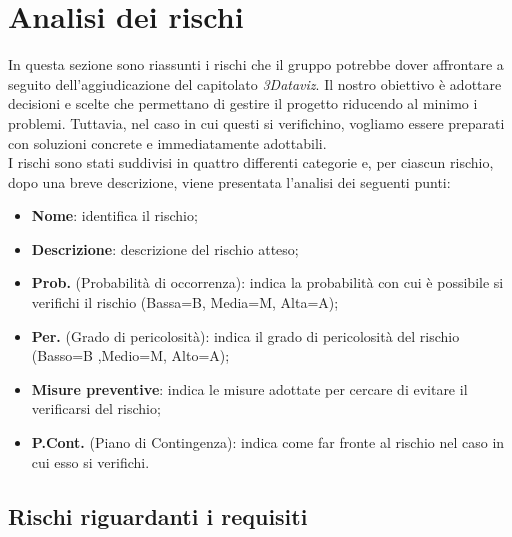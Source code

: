 \section{Analisi dei rischi}
In questa sezione sono riassunti i rischi che il gruppo potrebbe dover affrontare a seguito dell'aggiudicazione del capitolato \textit{3Dataviz}.
Il nostro obiettivo è adottare decisioni e scelte che permettano di gestire il progetto riducendo al minimo i problemi.
Tuttavia, nel caso in cui questi si verifichino, vogliamo essere preparati con soluzioni concrete e immediatamente adottabili.
\\I rischi sono stati suddivisi in quattro differenti categorie e, per ciascun rischio, dopo una breve descrizione, viene presentata l'analisi dei seguenti punti:
\begin{itemize}
    \item \textbf{Nome}: identifica il rischio;
    \item \textbf{Descrizione}: descrizione del rischio atteso;
    \item \textbf{Prob.} (Probabilità di occorrenza): indica la probabilità con cui è possibile si verifichi il rischio (Bassa=B, Media=M, Alta=A);
    \item \textbf{Per.} (Grado di pericolosità): indica il grado di pericolosità del rischio (Basso=B ,Medio=M, Alto=A);
    \item \textbf{Misure preventive}: indica le misure adottate per cercare di evitare il verificarsi del rischio;
    \item \textbf{P.Cont.} (Piano di Contingenza): indica come far fronte al rischio nel caso in cui esso si verifichi. 
\end{itemize}


\subsection{Rischi riguardanti i requisiti}
\pagebreak
